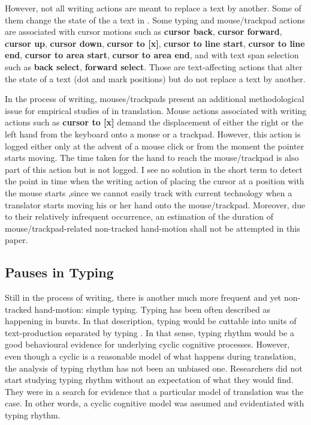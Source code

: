 \documentclass[output=paper]{LSP/langsci}
\begin{document}
However, not all writing actions are meant to replace a text by another. Some of them change the state of the a text in . Some typing and mouse/trackpad actions are associated with cursor motions such as \textbf{cursor back}, \textbf{cursor forward}, \textbf{cursor up}, \textbf{cursor down}, \textbf{cursor to [x]}, \textbf{cursor to line start}, \textbf{cursor to line end}, \textbf{cursor to area start}, \textbf{cursor to area end}, and with text span selection such as \textbf{back select}, \textbf{forward select}. Those are text-affecting actions that alter the state of a text (dot and mark positions) but do not replace a text by another.

In the process of writing, mouses/trackpads present an additional methodological issue for empirical studies of  in translation. Mouse actions associated with writing actions such as \textbf{cursor to [x]} demand the displacement of either the right or the left hand from the keyboard onto a mouse or a trackpad. However, this action is logged either only at the advent of a mouse click or from the moment the pointer starts moving. The time taken for the hand to reach the mouse/trackpad is also part of this action but is not logged. I see no solution in the short term to detect the point in time when the writing action of placing the cursor at a position with the mouse starts ,since we cannot easily track with current technology when a translator starts moving his or her hand onto the mouse/trackpad. Moreover, due to their relatively infrequent occurrence, an estimation of the duration of mouse/trackpad-related non-tracked hand-motion shall not be attempted in this paper.

\subsection{Pauses in Typing}
\label{couto:sec:PausesInTyping}


Still in the process of writing, there is another much more frequent and yet non-tracked hand-motion: simple typing. Typing has been often described as happening in bursts. In that description, typing would be cuttable into units of text-production separated by typing . In that sense, typing rhythm would be a good behavioural evidence for underlying cyclic cognitive processes. However, even though a cyclic  is a reasonable model of what happens during translation, the analysis of typing rhythm has not been an unbiased one. Researchers did not start studying typing rhythm without an expectation of what they would find. They were in a search for evidence that a particular model of translation was the case. In other words, a cyclic cognitive model was assumed and evidentiated with typing rhythm.
\end{document}
